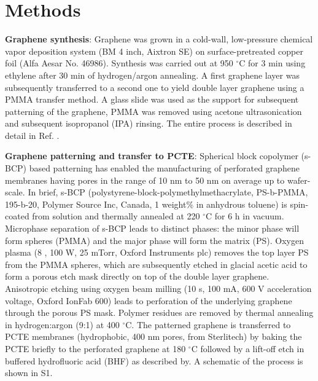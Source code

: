 \section{Methods}
\label{sec:methods}

\textbf{Graphene synthesis}: Graphene was grown in a cold-wall,
low-pressure chemical vapor deposition system (BM 4 inch, Aixtron SE)
on surface-pretreated copper foil (Alfa Aesar No. 46986). Synthesis was
carried out at 950 $^{\circ}$C for 3 min using ethylene after 30 min of
hydrogen/argon annealing. A first graphene layer was subsequently
transferred to a second one to yield double layer graphene using a
PMMA transfer method. A glass slide was used as the support for
subsequent patterning of the graphene, PMMA was removed using acetone
ultrasonication and subsequent isopropanol (IPA) rinsing. The entire
process is described in detail in Ref. \cite{Choi_2018_wafer_scale_gr}.

\vspace{1em}
\noindent
\textbf{Graphene patterning and transfer to PCTE}: Spherical block
copolymer (s-BCP) based patterning has enabled the manufacturing of
perforated graphene membranes having pores in the range of 10 nm to 50
nm on average up to wafer-scale\cite{Choi_2018_wafer_scale_gr}. In brief, s-BCP
(polystyrene-block-polymethylmethacrylate, PS-b-PMMA, 195-b-20,
Polymer Source Inc, Canada, 1 weight\% in anhydrous toluene) is
spin-coated from solution and thermally annealed at 220 $^{\circ}$C
for 6 h in vacuum. Microphase separation of s-BCP leads to distinct
phases: the minor phase will form spheres (PMMA) and the major phase
will form the matrix (PS). Oxygen plasma (8 , 100 W, 25 mTorr, Oxford
Instruments plc) removes the top layer PS from the PMMA spheres, which
are subsequently etched in glacial acetic acid to form a porous
etch mask directly on top of the double layer graphene. Anisotropic
etching using oxygen beam milling (10 s, 100 mA, 600 V acceleration
voltage, Oxford IonFab 600) leads to perforation of the underlying
graphene through the porous PS mask. Polymer residues are removed by
thermal annealing in hydrogen:argon (9:1) at 400 $^{\circ}$C. The
patterned graphene is transferred to PCTE membranes (hydrophobic, 400
nm pores, from Sterlitech) by baking the PCTE briefly to the
perforated graphene at 180 $^{\circ}$C followed by a lift-off etch in
buffered hydrofluoric acid (BHF) as described by\cite{Choi_2018_wafer_scale_gr}. A
schematic of the process is shown in  S1.

